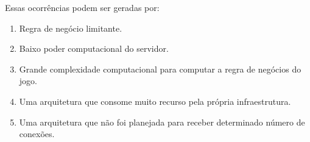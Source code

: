 Essas ocorrências podem ser geradas por:

\begin{enumerate}
  \item Regra de negócio limitante.
  \item Baixo poder computacional do servidor.
  \item Grande complexidade computacional para computar a regra de negócios do jogo.
  \item Uma arquitetura que consome muito recurso pela própria infraestrutura.
  \item Uma arquitetura que não foi planejada para receber determinado número de conexões.
\end{enumerate}

